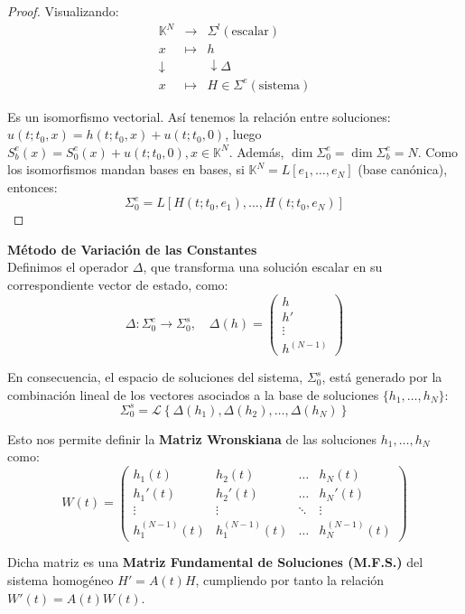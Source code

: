 \begin{proof}
Visualizando:
\[
\begin{matrix}
\mathbb{K}^N & \longrightarrow & \Sigma^l (\text{escalar}) \\
x & \longmapsto & h \\
\downarrow & & \downarrow \Delta \\
x & \longmapsto & H \in \Sigma^e (\text{sistema})
\end{matrix}
\]

Es un isomorfismo vectorial.
Así tenemos la relación entre soluciones: $u(t; t_0, x) = h(t; t_0, x) + u(t; t_0, 0)$, luego $S_b^e(x) = S_0^e(x) + u(t; t_0, 0), x \in \mathbb{K}^N$.
Además, $\dim \Sigma_0^e = \dim \Sigma_b^e = N$.
Como los isomorfismos mandan bases en bases, si $\mathbb{K}^N = L[e_1, \dots, e_N]$ (base canónica), entonces:
    \[ \Sigma_0^e = L[H(t; t_0, e_1), \dots, H(t; t_0, e_N)] \]
\end{proof}

\textbf{Método de Variación de las Constantes}\\

Definimos el operador $\Delta$, que transforma una solución escalar en su correspondiente vector de estado, como:
\[ 
\Delta : \Sigma_0^e \longrightarrow \Sigma_0^s, \quad \Delta(h) = \begin{pmatrix} h \\ h' \\ \vdots \\ h^{(N-1)} \end{pmatrix} 
\]

En consecuencia, el espacio de soluciones del sistema, $\Sigma_0^s$, está generado por la combinación lineal de los vectores asociados a la base de soluciones $\{h_1, \dots, h_N\}$:
\[ 
\Sigma_0^s = \mathcal{L} \left\{ \Delta(h_1), \Delta(h_2), \dots, \Delta(h_N) \right\} 
\]

Esto nos permite definir la \textbf{Matriz Wronskiana} de las soluciones $h_1, \dots, h_N$ como:
\[
W(t) = \begin{pmatrix} 
h_1(t) & h_2(t) & \dots & h_N(t) \\ 
h_1'(t) & h_2'(t) & \dots & h_N'(t) \\ 
\vdots & \vdots & \ddots & \vdots \\ 
h_1^{(N-1)}(t) & h_1^{(N-1)}(t) & \dots & h_N^{(N-1)}(t) 
\end{pmatrix}
\] 

Dicha matriz es una \textbf{Matriz Fundamental de Soluciones (M.F.S.)} del sistema homogéneo $H' = A(t)H$, cumpliendo por tanto la relación $W'(t) = A(t)W(t)$.

